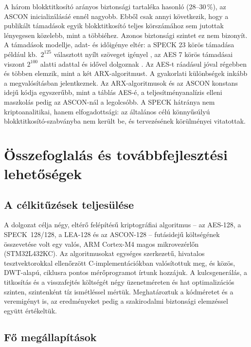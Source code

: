 \documentclass[a4paper,12pt]{report}
\theoremstyle{definition}
\theoremstyle{remark}
\begin{document}
A három blokktitkosító arányos biztonsági tartaléka hasonló (28--30\,\%), az ASCON inicializálásáé ennél nagyobb. Ebből csak annyi következik, hogy a publikált támadások egyik blokktitkosító teljes körszámához sem jutottak lényegesen közelebb, mint a többiéhez. Azonos biztonsági szintet ez nem bizonyít. A támadások modellje, adat- és időigénye eltér: a SPECK 23 körös támadása például kb.\ $2^{125}$ választott nyílt szöveget igényel \cite{Song2016}, az AES 7 körös támadásai viszont $2^{100}$ alatti adattal és idővel dolgoznak \cite{Derbez2013}. Az AES-t ráadásul jóval régebben és többen elemzik, mint a két ARX-algoritmust. A gyakorlati különbségek inkább a megvalósításban jelentkeznek. Az ARX-algoritmusok és az ASCON konstans idejű kódja egyszerűbb, mint a táblás AES-é, a teljesítményanalízis elleni maszkolás pedig az ASCON-nál a legolcsóbb. A SPECK hátránya nem kriptoanalitikai, hanem elfogadottsági: az általános célú könnyűsúlyú blokktitkosító-szabványba nem került be, és tervezésének körülményei vitatottak.

\chapter{Összefoglalás és továbbfejlesztési lehetőségek}\label{chap:osszefoglalas}

\section{A célkitűzések teljesülése}

A dolgozat célja négy, eltérő felépítésű kriptográfiai algoritmus -- az AES-128, a SPECK~128/128, a LEA-128 és az ASCON-128 -- futásidejű költségének összevetése volt egy valós, ARM Cortex-M4 magos mikrovezérlőn (STM32L432KC). Az algoritmusokat egységes szerkezetű, hivatalos tesztvektorokkal ellenőrzött C-implementációkban valósítottuk meg, és közös, DWT-alapú, ciklusra pontos mérőprogramot írtunk hozzájuk. A kulcsgenerálás, a titkosítás és a visszafejtés költségét négy üzenetméreten és hat optimalizációs szinten, szintenként tíz ismétléssel mértük. Meghatároztuk a kódméretet és a veremigényt is, az eredményeket pedig a szakirodalmi biztonsági elemzéssel együtt értékeltük.

\section{Fő megállapítások}
\end{document}
